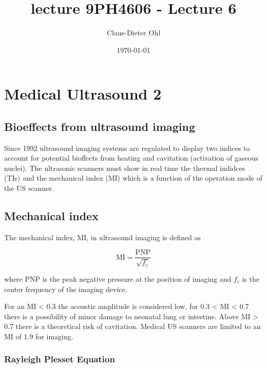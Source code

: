 \documentclass{article}
\title{lecture 9}
\begin{document}
    
    
    \author{Claus-Dieter Ohl}\title{PH4606 - Lecture 6}

\date{\today}
\maketitle

    
    

    
\section{Medical Ultrasound 2}\label{medical-ultrasound-2}
\subsection{Bioeffects from ultrasound
imaging}\label{bioeffects-from-ultrasound-imaging}

Since 1992 ultrasound imaging systems are regulated to display two
indices to account for potential bioffects from heating and cavitation
(activation of gaseous nuclei). The ultrasonic scanners must show in
real time the thermal indidces (TIs) and the mechanical index (MI) which
is a function of the operation mode of the US scanner.

\subsection{Mechanical index}\label{mechanical-index}

The mechanical index, MI, in ultrasound imaging is defined as

\begin{equation}
\mathrm{MI}=\frac{\mathrm{PNP}}{\sqrt{f_c}}\label{eq:9.1}\tag{9.1}
\end{equation}

where PNP is the peak negative pressure at the position of imaging and
\(f_c\) is the center frequency of the imaging device.

For an MI \textless{} 0.3 the acoustic amplitude is considered low, for
0.3 \textless{} MI \textless{} 0.7 there is a possibility of minor
damage to neonatal lung or intestine. Above MI \textgreater{} 0.7 there
is a theoretical risk of cavitation. Medical US scanners are limited to
an MI of 1.9 for imaging.
\subsubsection{Rayleigh Plesset
Equation}\label{rayleigh-plesset-equation}
\end{document}
